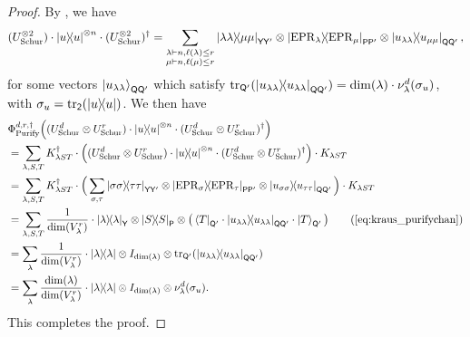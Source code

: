 \begin{proof}
    By , we have 
    \begin{equation*}
        (U_{\mathrm{Schur}}^{\otimes 2}) \cdot \ketbra{u}^{\otimes n} \cdot (U_{\mathrm{Schur}}^{\otimes 2})^{\dagger} = \sum_{\substack{\lambda \vdash n, \ell(\lambda) \leq r \\ \mu \vdash n, \ell(\mu) \leq r}} \ketbra{\lambda\lambda}{\mu\mu}_{\mathsf{YY'}} \otimes \ketbra{\mathrm{EPR}_\lambda}{\mathrm{EPR}_\mu}_{\mathsf{PP'}} \otimes \ketbra{u_{\lambda\lambda}}{u_{\mu \mu}}_{\mathsf{QQ'}},
    \end{equation*}
    for some vectors $\ket{u_{\lambda\lambda}}_{\mathsf{QQ'}}$ which satisfy $\tr_{\mathsf{Q'}}(\ketbra{u_{\lambda\lambda}}_{\mathsf{QQ'}}) = \dim(\lambda) \cdot \nu_\lambda^d(\sigma_u)$, with $\sigma_u = \tr_{\mathsf{2}}(\ketbra{u})$. 
We then have
    \begin{align*}
        & \purifychan^{d,r,\dagger}\Big( (\schur^d \otimes \schur^r) \cdot \ketbra{u}^{\otimes n} \cdot (\schur^d \otimes \schur^r)^\dagger \Big) \\
        & = \sum_{\lambda, S, T} K_{\lambda S T}^\dagger \cdot \Big( (\schur^d \otimes \schur^r) \cdot \ketbra{u}^{\otimes n} \cdot (\schur^d \otimes \schur^r)^\dagger \Big) \cdot K_{\lambda S T} \\
        & = \sum_{\lambda,S,T} K^\dagger_{\lambda S T} \cdot \Big( \sum_{\sigma, \tau} \ketbra{\sigma \sigma}{\tau \tau}_{\reg{YY'}} \otimes \ketbra{\epr_\sigma}{\epr_{\tau}}_{\reg{PP'}} \otimes \ketbra{u_{\sigma \sigma}}{{u_{\tau \tau}}}_{\reg{QQ'}} \Big) \cdot K_{\lambda S T} \\
        & = \sum_{\lambda, S,T} \frac{1}{\dim(V^r_\lambda)} \cdot \ketbra{\lambda}_{\reg{Y}} \otimes \ketbra{S}_{\reg{P}} \otimes \big(\bra{T}_{\reg{Q}'}\cdot \ketbra{u_{\lambda \lambda}}_{\reg{QQ'}} \cdot \ket{T}_{\reg{Q}'}\big) \tag{\Cref{eq:kraus_purifychan}} \\
        & = \sum_{\lambda} \frac{1}{\dim(V^r_\lambda)} \cdot \ketbra{\lambda} \otimes I_{\dim(\lambda)} \otimes \tr_{\reg{Q'}}(\ketbra{u_{\lambda \lambda}}_{\reg{QQ'}} )  \\
        & =  \sum_{\lambda} \frac{\dim(\lambda)}{\dim(V^r_\lambda)} \cdot \ketbra{\lambda} \otimes I_{\dim(\lambda)} \otimes \nu_\lambda^d(\sigma_u).
    \end{align*}
    This completes the proof. 
\end{proof}

